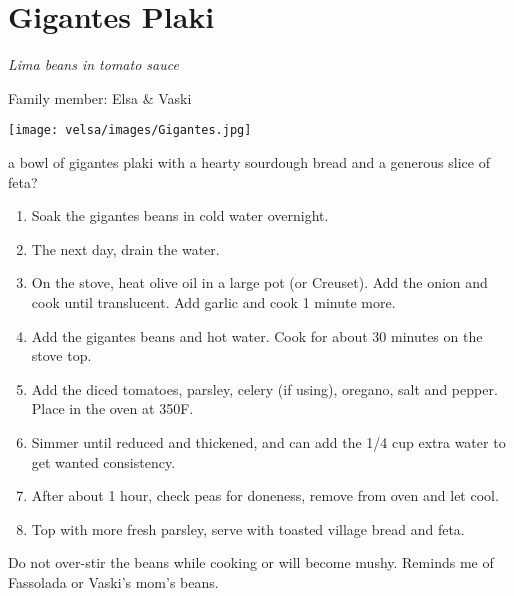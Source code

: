 \chapter{Gigantes Plaki}
\label{ch:gigantes-plaki}


\textit{Lima beans in tomato sauce}

Family member: Elsa \& Vaski

\begin{marginfigure}
  \texttt{[image: velsa/images/Gigantes.jpg]}
\end{marginfigure}

 a bowl of gigantes plaki with a hearty sourdough bread and a generous slice of feta?

\bigskip

\begin{enumerate}
    \item Soak the gigantes beans in cold water overnight.
    \item The next day, drain the water.
    \item On the stove, heat olive oil in a large pot (or Creuset). Add the onion and cook until translucent. Add garlic and cook 1 minute more.
    \item Add the gigantes beans and hot water. Cook for about 30 minutes on the stove top.
    \item Add the diced tomatoes, parsley, celery (if using), oregano, salt and pepper. Place in the oven at 350\degree F.
    \item Simmer until reduced and thickened, and can add the 1/4 cup extra water to get wanted consistency.
    \item After about 1 hour, check peas for doneness, remove from oven and let cool.
    \item Top with more fresh parsley, serve with toasted village bread and feta.
\end{enumerate}

Do not over-stir the beans while cooking or will become mushy.
Reminds me of Fassolada or Vaski's mom's beans.

